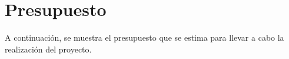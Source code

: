
\section{Presupuesto}
\label{5:sec:2}

A continuación, se muestra el presupuesto que se estima para llevar a cabo la realización del proyecto.

